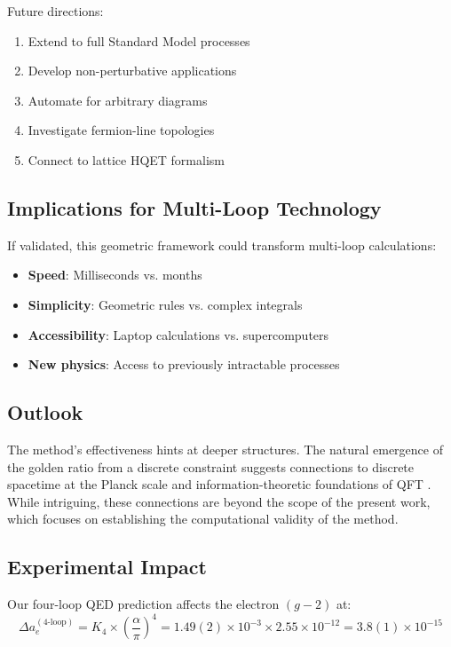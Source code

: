 \documentclass[11pt,a4paper]{article}
\theoremstyle{definition}
\theoremstyle{remark}
\begin{document}
Future directions:
\begin{enumerate}
\item Extend to full Standard Model processes
\item Develop non-perturbative applications
\item Automate for arbitrary diagrams
\item Investigate fermion-line topologies
\item Connect to lattice HQET formalism
\end{enumerate}

\subsection{Implications for Multi-Loop Technology}

If validated, this geometric framework could transform multi-loop calculations:
\begin{itemize}
\item \textbf{Speed}: Milliseconds vs. months
\item \textbf{Simplicity}: Geometric rules vs. complex integrals
\item \textbf{Accessibility}: Laptop calculations vs. supercomputers
\item \textbf{New physics}: Access to previously intractable processes
\end{itemize}

\subsection{Outlook}

The method's effectiveness hints at deeper structures. The natural emergence of the golden ratio from a discrete constraint suggests connections to discrete spacetime at the Planck scale \cite{Snyder1947,Rovelli2004,Ambjorn2012} and information-theoretic foundations of QFT \cite{Bousso2002,Susskind2016,Witten2018}. While intriguing, these connections are beyond the scope of the present work, which focuses on establishing the computational validity of the method.

\subsection{Experimental Impact}

Our four-loop QED prediction affects the electron $(g-2)$ at:
\[
\Delta a_e^{(4\text{-loop})} = K_4 \times \left(\frac{\alpha}{\pi}\right)^4 = 1.49(2) \times 10^{-3} \times 2.55 \times 10^{-12} = 3.8(1) \times 10^{-15}
\]
\end{document}
